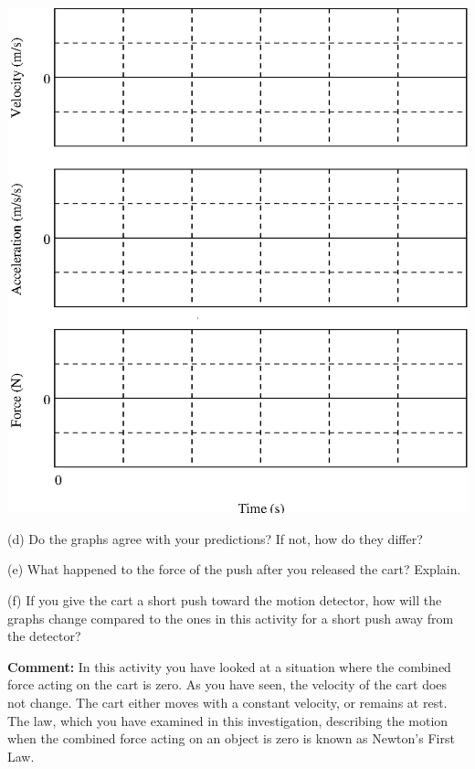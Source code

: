 \vspace{0.3cm}
{\par\centering \includegraphics{force2/force2_fig4.eps} \par}
\vspace{0.3cm}

(d) Do the graphs agree with your predictions? If not, how do they differ?
\vspace{20mm}

(e) What happened to the force of the push after you released the cart? Explain.
\vspace{20mm}

(f) If you give the cart a short push toward the motion detector, how will the
graphs change compared to the ones in this activity for a short push away from
the detector?
\vspace{20mm}

\textbf{Comment:} In this activity you have looked at a situation where the
combined force acting on the cart is zero. As you have seen, the velocity of
the cart does not change. The cart either moves with a constant velocity, or
remains at rest. The law, which you have examined in this investigation, describing
the motion when the combined force acting on an object is zero is known as Newton's
First Law.

